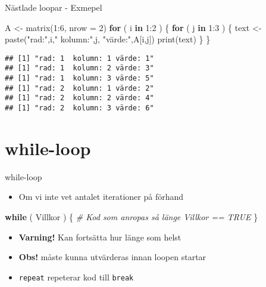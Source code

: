 \documentclass[
  11pt,
  ignorenonframetext,
]{beamer}
\newenvironment{Shaded}{\begin{snugshade}}{\end{snugshade}}
\newcommand{\AttributeTok}[1]{\textcolor[rgb]{0.77,0.63,0.00}{#1}}
\newcommand{\CommentTok}[1]{\textcolor[rgb]{0.56,0.35,0.01}{\textit{#1}}}
\newcommand{\ControlFlowTok}[1]{\textcolor[rgb]{0.13,0.29,0.53}{\textbf{#1}}}
\newcommand{\DecValTok}[1]{\textcolor[rgb]{0.00,0.00,0.81}{#1}}
\newcommand{\FunctionTok}[1]{\textcolor[rgb]{0.00,0.00,0.00}{#1}}
\newcommand{\NormalTok}[1]{#1}
\newcommand{\OtherTok}[1]{\textcolor[rgb]{0.56,0.35,0.01}{#1}}
\newcommand{\SpecialCharTok}[1]{\textcolor[rgb]{0.00,0.00,0.00}{#1}}
\newcommand{\StringTok}[1]{\textcolor[rgb]{0.31,0.60,0.02}{#1}}
\providecommand{\tightlist}{%
  \setlength{\itemsep}{0pt}\setlength{\parskip}{0pt}}
\newcommand\imp[1]{\alert{\textbf{#1}}}
\begin{document}
\begin{frame}[fragile]{Nästlade loopar - Exmepel}
\protect\hypertarget{nuxe4stlade-loopar---exmepel}{}
\begin{Shaded}
\begin{Highlighting}[]
\NormalTok{A }\OtherTok{\textless{}{-}} \FunctionTok{matrix}\NormalTok{(}\DecValTok{1}\SpecialCharTok{:}\DecValTok{6}\NormalTok{, }\AttributeTok{nrow =} \DecValTok{2}\NormalTok{)}
\ControlFlowTok{for}\NormalTok{ ( i }\ControlFlowTok{in} \DecValTok{1}\SpecialCharTok{:}\DecValTok{2}\NormalTok{ ) \{}
  \ControlFlowTok{for}\NormalTok{ ( j }\ControlFlowTok{in} \DecValTok{1}\SpecialCharTok{:}\DecValTok{3}\NormalTok{ ) \{}
\NormalTok{    text }\OtherTok{\textless{}{-}} \FunctionTok{paste}\NormalTok{(}\StringTok{"rad:"}\NormalTok{,i,}\StringTok{" kolumn:"}\NormalTok{,j,}
                  \StringTok{"värde:"}\NormalTok{,A[i,j])}
    \FunctionTok{print}\NormalTok{(text)}
\NormalTok{  \}}
\NormalTok{\}}
\end{Highlighting}
\end{Shaded}

\pause

\begin{verbatim}
## [1] "rad: 1  kolumn: 1 värde: 1"
## [1] "rad: 1  kolumn: 2 värde: 3"
## [1] "rad: 1  kolumn: 3 värde: 5"
## [1] "rad: 2  kolumn: 1 värde: 2"
## [1] "rad: 2  kolumn: 2 värde: 4"
## [1] "rad: 2  kolumn: 3 värde: 6"
\end{verbatim}
\end{frame}

\hypertarget{while-loop}{%
\section{while-loop}\label{while-loop}}

\begin{frame}[fragile]{while-loop}
\protect\hypertarget{while-loop-1}{}
\begin{itemize}
\tightlist
\item
  Om vi inte vet antalet iterationer på förhand
\end{itemize}

\begin{Shaded}
\begin{Highlighting}[]
\ControlFlowTok{while}\NormalTok{ ( Villkor ) \{}
  \CommentTok{\# Kod som anropas så länge Villkor == TRUE}
\NormalTok{\}}
\end{Highlighting}
\end{Shaded}

\begin{itemize}
\tightlist
\item
  \imp{Varning!} Kan fortsätta hur länge som helst
\item
  \imp{Obs!}  måste kunna utvärderas innan loopen startar
\item
  \texttt{repeat} repeterar kod till \texttt{break}
\end{itemize}
\end{frame}
\end{document}
